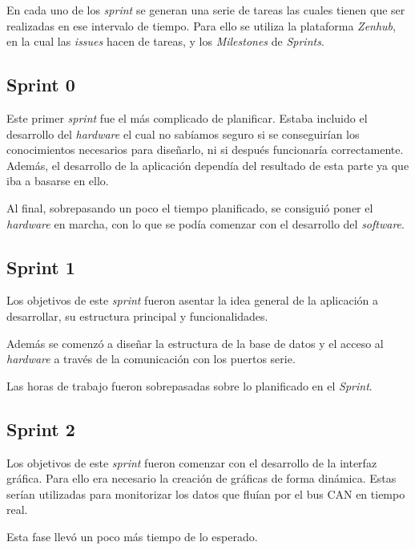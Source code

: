 En cada uno de los \emph{sprint} se generan una serie de tareas las cuales tienen que ser realizadas en ese intervalo de tiempo. Para ello se utiliza la plataforma \emph{Zenhub}, en la cual las \emph{issues} hacen de tareas, y los \emph{Milestones} de \emph{Sprints}.

\subsection{Sprint 0}

Este primer \emph{sprint} fue el más complicado de planificar. Estaba incluido el desarrollo del \emph{hardware} el cual no sabíamos seguro si se conseguirían los conocimientos necesarios para diseñarlo, ni si después funcionaría correctamente. Además, el desarrollo de la aplicación dependía del resultado de esta parte ya que iba a basarse en ello.

Al final, sobrepasando un poco el tiempo planificado, se consiguió poner el \emph{hardware} en marcha, con lo que se podía comenzar con el desarrollo del \emph{software}.


\subsection{Sprint 1}

Los objetivos de este \emph{sprint} fueron asentar la idea general de la aplicación a desarrollar, su estructura principal y funcionalidades.

Además se comenzó a diseñar la estructura de la base de datos y el acceso al \emph{hardware} a través de la comunicación con los puertos serie.

Las horas de trabajo fueron sobrepasadas sobre lo planificado en el \emph{Sprint}.


\subsection{Sprint 2}

Los objetivos de este \emph{sprint} fueron comenzar con el desarrollo de la interfaz gráfica. Para ello era necesario la creación de gráficas de forma dinámica. Estas serían utilizadas para monitorizar los datos que fluían por el bus CAN en tiempo real.

Esta fase llevó un poco más tiempo de lo esperado.



